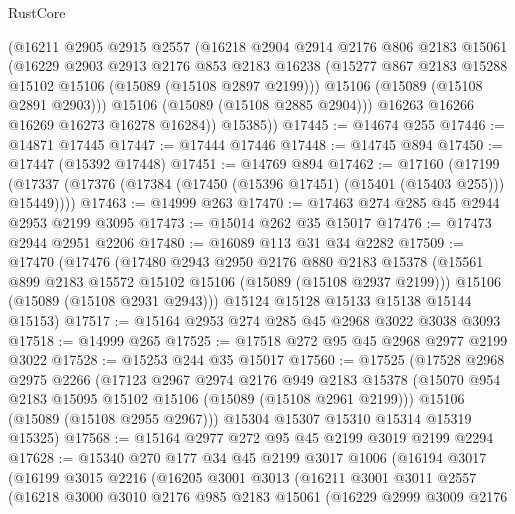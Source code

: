 \begin{lexlean}{RustCore}
\begin{coremodule}
          (@16211
            @2905
            @2915
            @2557
            (@16218
              @2904
              @2914
              @2176
              @806
              @2183
              @15061
              (@16229
                @2903
                @2913
                @2176
                @853
                @2183
                @16238
                (@15277 @867 @2183 @15288 @15102 @15106 (@15089 (@15108 @2897 @2199)))
                @15106
                (@15089 (@15108 @2891 @2903)))
              @15106
              (@15089 (@15108 @2885 @2904)))
            @16263
            @16266
            @16269
            @16273
            @16278
            @16284))
        @15385))
@17445 := @14674 @255
@17446 := @14871 @17445
@17447 := @17444 @17446
@17448 := @14745 @894
@17450 := @17447 (@15392 @17448)
@17451 := @14769 @894
@17462 := @17160
    (@17199 (@17337 (@17376 (@17384 (@17450 (@15396 @17451) (@15401 (@15403 @255))) @15449))))
@17463 := @14999 @263
@17470 := @17463 @274 @285 @45 @2944 @2953 @2199 @3095
@17473 := @15014 @262 @35 @15017
@17476 := @17473 @2944 @2951 @2206
@17480 := @16089 @113 @31 @34 @2282
@17509 := @17470
    (@17476
      (@17480
        @2943
        @2950
        @2176
        @880
        @2183
        @15378
        (@15561 @899 @2183 @15572 @15102 @15106 (@15089 (@15108 @2937 @2199)))
        @15106
        (@15089 (@15108 @2931 @2943)))
      @15124
      @15128
      @15133
      @15138
      @15144
      @15153)
@17517 := @15164 @2953 @274 @285 @45 @2968 @3022 @3038 @3093
@17518 := @14999 @265
@17525 := @17518 @272 @95 @45 @2968 @2977 @2199 @3022
@17528 := @15253 @244 @35 @15017
@17560 := @17525
    (@17528
      @2968
      @2975
      @2266
      (@17123
        @2967
        @2974
        @2176
        @949
        @2183
        @15378
        (@15070 @954 @2183 @15095 @15102 @15106 (@15089 (@15108 @2961 @2199)))
        @15106
        (@15089 (@15108 @2955 @2967)))
      @15304
      @15307
      @15310
      @15314
      @15319
      @15325)
@17568 := @15164 @2977 @272 @95 @45 @2199 @3019 @2199 @2294
@17628 := @15340
    @270
    @177
    @34
    @45
    @2199
    @3017
    @1006
    (@16194
      @3017
      (@16199
        @3015
        @2216
        (@16205
          @3001
          @3013
          (@16211
            @3001
            @3011
            @2557
            (@16218
              @3000
              @3010
              @2176
              @985
              @2183
              @15061
              (@16229
                @2999
                @3009
                @2176

\end{coremodule}
\end{lexlean}
